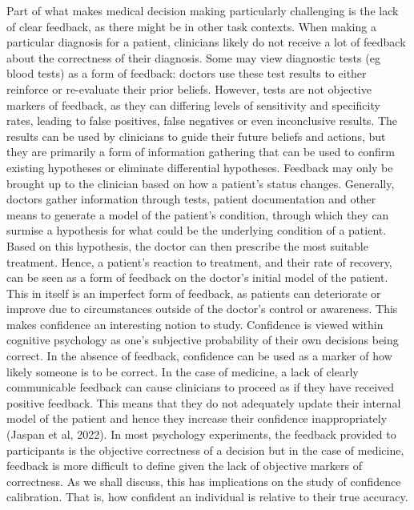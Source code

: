 \documentclass[a4paper, nobind]{templates/ociamthesis}
\begin{document}
Part of what makes medical decision making particularly challenging is the lack of clear feedback, as there might be in other task contexts. When making a particular diagnosis for a patient, clinicians likely do not receive a lot of feedback about the correctness of their diagnosis. Some may view diagnostic tests (eg blood tests) as a form of feedback: doctors use these test results to either reinforce or re-evaluate their prior beliefs. However, tests are not objective markers of feedback, as they can differing levels of sensitivity and specificity rates, leading to false positives, false negatives or even inconclusive results. The results can be used by clinicians to guide their future beliefs and actions, but they are primarily a form of information gathering that can be used to confirm existing hypotheses or eliminate differential hypotheses. Feedback may only be brought up to the clinician based on how a patient's status changes. Generally, doctors gather information through tests, patient documentation and other means to generate a model of the patient's condition, through which they can surmise a hypothesis for what could be the underlying condition of a patient. Based on this hypothesis, the doctor can then prescribe the most suitable treatment. Hence, a patient's reaction to treatment, and their rate of recovery, can be seen as a form of feedback on the doctor's initial model of the patient. This in itself is an imperfect form of feedback, as patients can deteriorate or improve due to circumstances outside of the doctor's control or awareness. This makes confidence an interesting notion to study. Confidence is viewed within cognitive psychology as one's subjective probability of their own decisions being correct. In the absence of feedback, confidence can be used as a marker of how likely someone is to be correct. In the case of medicine, a lack of clearly communicable feedback can cause clinicians to proceed as if they have received positive feedback. This means that they do not adequately update their internal model of the patient and hence they increase their confidence inappropriately (Jaspan et al, 2022). In most psychology experiments, the feedback provided to participants is the objective correctness of a decision but in the case of medicine, feedback is more difficult to define given the lack of objective markers of correctness. As we shall discuss, this has implications on the study of confidence calibration. That is, how confident an individual is relative to their true accuracy.
\end{document}
